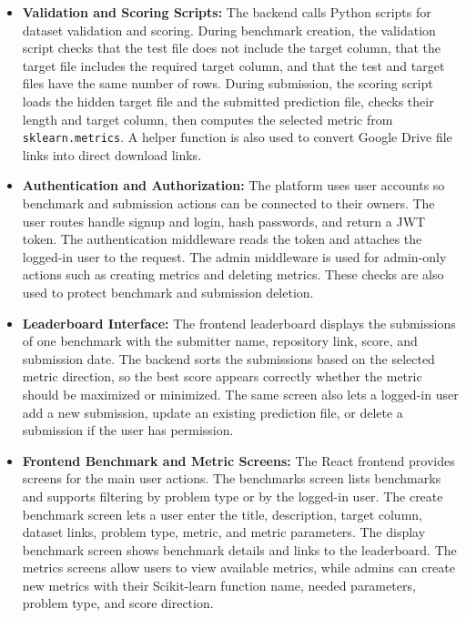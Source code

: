 \documentclass[12pt,a4paper]{report}
\begin{document}
\begin{itemize}
  \item \textbf{Validation and Scoring Scripts:}
  The backend calls Python scripts for dataset validation and scoring. During
  benchmark creation, the validation script checks that the test file does not
  include the target column, that the target file includes the required target
  column, and that the test and target files have the same number of rows.
  During submission, the scoring script loads the hidden target file and the
  submitted prediction file, checks their length and target column, then
  computes the selected metric from \texttt{sklearn.metrics}. A helper function
  is also used to convert Google Drive file links into direct download links.

  \item \textbf{Authentication and Authorization:}
  The platform uses user accounts so benchmark and submission actions can be
  connected to their owners. The user routes handle signup and login, hash
  passwords, and return a JWT token. The authentication middleware reads the
  token and attaches the logged-in user to the request. The admin middleware is
  used for admin-only actions such as creating metrics and deleting metrics.
  These checks are also used to protect benchmark and submission deletion.

  \item \textbf{Leaderboard Interface:}
  The frontend leaderboard displays the submissions of one benchmark with the
  submitter name, repository link, score, and submission date. The backend sorts
  the submissions based on the selected metric direction, so the best score
  appears correctly whether the metric should be maximized or minimized. The
  same screen also lets a logged-in user add a new submission, update an
  existing prediction file, or delete a submission if the user has permission.

  \item \textbf{Frontend Benchmark and Metric Screens:}
  The React frontend provides screens for the main user actions. The benchmarks
  screen lists benchmarks and supports filtering by problem type or by the
  logged-in user. The create benchmark screen lets a user enter the title,
  description, target column, dataset links, problem type, metric, and metric
  parameters. The display benchmark screen shows benchmark details and links to
  the leaderboard. The metrics screens allow users to view available metrics,
  while admins can create new metrics with their Scikit-learn function name,
  needed parameters, problem type, and score direction.
\end{itemize}
\end{document}
